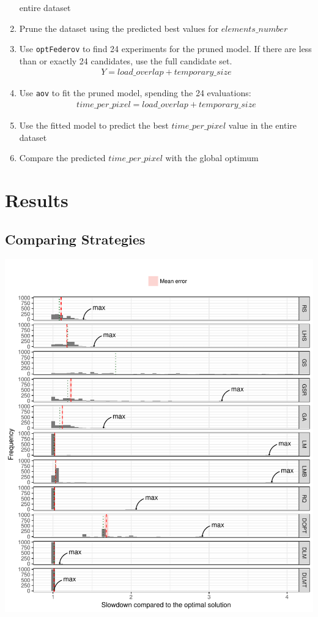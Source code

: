 \documentclass[final,12pt,a4paper]{article}
\begin{document}
\begin{enumerate}
entire dataset
\item Prune the dataset using the predicted best values for \(elements\_number\)
\item Use \texttt{optFederov} to find 24 experiments for the pruned model. If there are less
than or exactly 24 candidates, use the full candidate set.
\begin{align*}
    Y = load\_overlap + temporary\_size
\end{align*}
\item Use \texttt{aov} to fit the pruned model, spending the 24 evaluations:
\begin{align*}
      time\_per\_pixel = load\_overlap + temporary\_size
\end{align*}
\item Use the fitted model to predict the best \(time\_per\_pixel\) value in the
entire dataset
\item Compare the predicted \(time\_per\_pixel\) with the global optimum
\end{enumerate}
\section{Results}
\label{sec:org6bebcd2}
\subsection{Comparing Strategies}
\label{sec:orgc639a14}
\begin{center}
\includegraphics[width=.9\linewidth]{../img/comparison_histogram.pdf}
\end{center}
\end{document}
